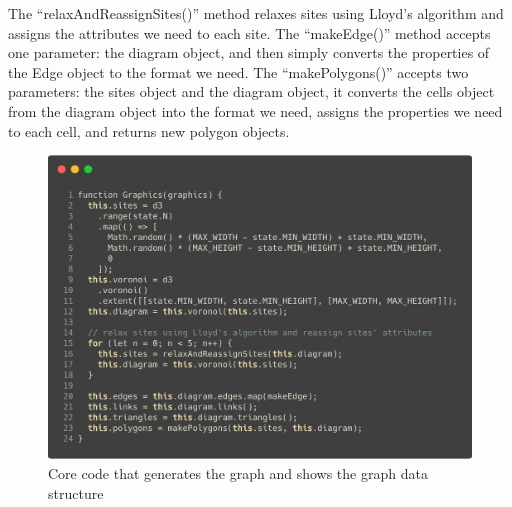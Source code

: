 The ``relaxAndReassignSites()'' method relaxes sites using Lloyd's algorithm and assigns the attributes we need to each site. The ``makeEdge()'' method accepts one parameter: the diagram object, and then simply converts the properties of the Edge object to the format we need. The ``makePolygons()'' accepts two parameters: the sites object and the diagram object, it converts the cells object from the diagram object into the format we need, assigns the properties we need to each cell, and returns new polygon objects.

\begin{figure}[htbp]
  \centering
  \includegraphics[width=\textwidth]{section04/assets/Graphics.png}
  \caption{Core code that generates the graph and shows the graph data structure}
  \label{fig:Code graph}
\end{figure}
